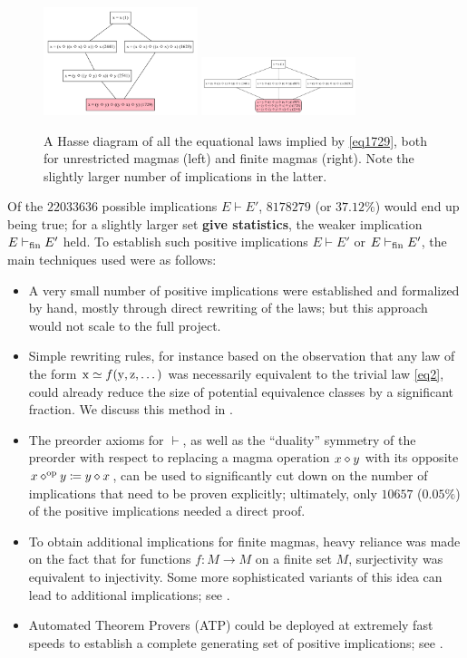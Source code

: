 \begin{figure}
    \centering
    \includegraphics[width=0.4\textwidth]{ramanujan-infinite.png}
    \includegraphics[width=0.4\textwidth]{ramanujan-finite.png}
    \caption{A Hasse diagram of all the equational laws implied by \eqref{eq1729}, both for unrestricted magmas (left) and finite magmas (right). Note the slightly larger number of implications in the latter.}
    \label{fig:1729}
\end{figure}


Of the $22033636$ possible implications $E \vdash E'$, $8178279$ (or $37.12\%$) would end up being true; for a slightly larger set  {\bf give statistics}, the weaker implication $E \vdash_{\mathrm{fin}} E'$ held. To establish such positive implications $E \vdash E'$ or $E \vdash_{\mathrm{fin}} E'$, the main techniques used were as follows:

\begin{itemize}
    \item A very small number of positive implications were established and formalized by hand, mostly through direct rewriting of the laws; but this approach would not scale to the full project.
    \item Simple rewriting rules, for instance based on the observation that any law of the form $\mathrm{x} \simeq f(\mathrm{y},\mathrm{z},\dots)$ was necessarily equivalent to the trivial law \eqref{eq2}, could already reduce the size of potential equivalence classes by a significant fraction. We discuss this method in .
    \item The preorder axioms for $\vdash$, as well as the ``duality'' symmetry of the preorder with respect to replacing a magma operation $x \diamond y$ with its opposite $x \diamond^{\mathrm{op}} y \coloneqq y \diamond x$, can be used to significantly cut down on the number of implications that need to be proven explicitly; ultimately, only $10657$ ($0.05\%$) of the positive implications needed a direct proof. 
    \item To obtain additional implications for finite magmas, heavy reliance was made on the fact that for functions $f \colon M \to M$ on a finite set $M$, surjectivity was equivalent to injectivity.  Some more sophisticated variants of this idea can lead to additional implications; see .
    \item Automated Theorem Provers (ATP) could be deployed at extremely fast speeds to establish a complete generating set of positive implications; see .
\end{itemize}

